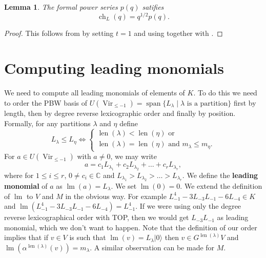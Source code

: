 \documentclass[12pt, a4paper]{article}
\newtheorem{lemma}{Lemma}
\DeclareMathOperator{\Vir}{Vir}
\DeclareMathOperator{\ch}{ch}
\DeclareMathOperator{\lm}{lm}
\DeclareMathOperator{\vspan}{span}
\DeclareMathOperator{\len}{len}
\newcommand{\vac}{|0\rangle}
\begin{document}
\begin{lemma}
  \label{lmm:6}
  The formal power series $p(q)$ satifies
  \begin{equation*}
    \ch_{L}(q) = q^{1/2}p(q).
  \end{equation*}
\end{lemma}

\begin{proof}
  This follows from  by setting $t = 1$ and using \cite[Theorem 4]{andrews_singular_2022} together with .
\end{proof}

\section{Computing leading monomials}
\label{sec:comp-lead-monom}

We need to compute all leading monomials of elements of $K$.
To do this we need to order the PBW basis of $U(\Vir_{\le -1})=\vspan\{L_\lambda\mid \lambda\text{ is a partition}\}$ first by length, then by degree reverse lexicographic order and finally by position.
Formally, for any partitions $\lambda$ and $\eta$ define
\begin{equation*}
  L_\lambda \le L_\eta \iff
  \begin{cases}
    \len(\lambda) < \len(\eta)\text{ or } \\
    \len(\lambda) = \len(\eta)\text{ and }m_\lambda \le m_\eta.
  \end{cases}
\end{equation*}
For $a \in U(\Vir_{\le -1})$ with $a \neq 0$, we may write
\begin{equation*}
  a = c_1L_{\lambda_1} + c_2L_{\lambda_2} + \dots + c_rL_{\lambda_r},
\end{equation*}
where for $1 \le i\le r$, $0 \neq c_i \in \mathbb{C}$ and $L_{\lambda_1} > L_{\lambda_2} > \dots > L_{\lambda_r}$.
We define the \textbf{leading monomial} of $a$ as $\lm(a) = L_\lambda$. 
We set $\lm(0) = 0$.
We extend the definition of $\lm$ to $V$ and $M$ in the obvious way.
For example $L_{-1}^4 - 3L_{-3}L_{-1} - 6L_{-4} \in K$ and $\lm(L_{-1}^4 - 3L_{-3}L_{-1} - 6L_{-4}) = L_{-1}^4$.
If we were using only the degree reverse lexicographical order with TOP, then we would get $L_{-3}L_{-1}$ as leading monomial, which we don't want to happen.
Note that the definition of our order implies that if $v \in V$ is such that $\lm(v) = L_\lambda\vac$ then $v \in G^{\len(\lambda)}V$ and $\lm(\alpha^{\len(\lambda)}(v)) = m_\lambda$.
A similar observation can be made for $M$.
\end{document}
